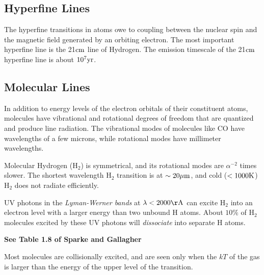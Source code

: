 \documentclass[12pt]{article}
\begin{document}
\subsection{Hyperfine Lines}

The hyperfine transitions in atoms owe to coupling between the nuclear
spin and the magnetic field generated by an orbiting electron. The
most important hyperfine line is the 21$\mathrm{cm}$ line of Hydrogen. The
emission timescale of the 21$\mathrm{cm}$ hyperfine line is about $10^{7}\mathrm{yr}$.

\subsection{Molecular Lines}

In addition to energy levels of the electron orbitals of their
constituent atoms, molecules have vibrational and rotational 
degrees of freedom that are quantized and produce line radiation.
The vibrational modes of molecules like CO have wavelengths of
a few microns, while rotational modes have millimeter wavelengths.

Molecular Hydrogen (H$_2$) is symmetrical, and its rotational
modes are $\alpha^{-2}$ times slower. The shortest wavelength
H$_2$ transition is at $\sim20\mu\mathrm{m}$, and cold ($<1000\mathrm{K}$) H$_2$
does not radiate efficiently.

UV photons in the {\it Lyman-Werner bands} at $\lambda<2000\Ang$ can
excite H$_2$ into an electron level with a larger energy than two
unbound H atoms. About $10\%$ of H$_2$ molecules excited by these UV
photons will {\it dissociate} into separate H atoms.

{\bf See Table 1.8 of Sparke and Gallagher}

Most molecules are collisionally excited, and are seen only
when the $kT$ of the gas is larger than the energy of the upper
level of the transition.
\end{document}
